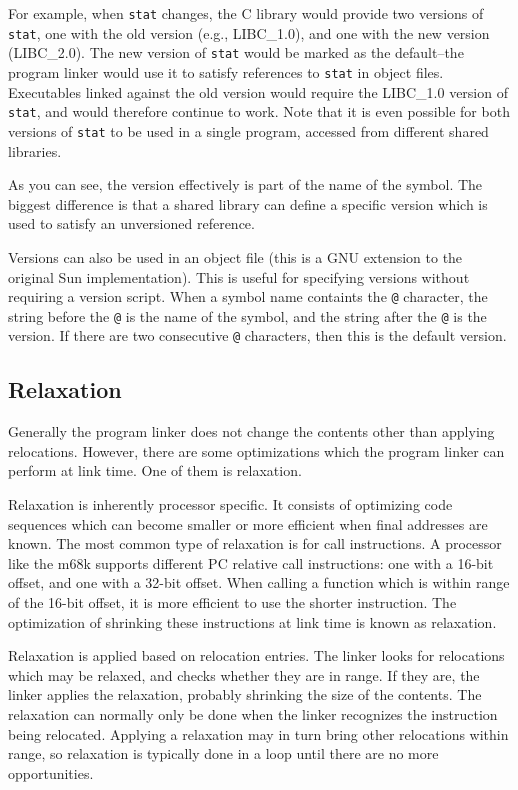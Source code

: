 For example, when \texttt{stat} changes, the C library would provide two
versions of \texttt{stat}, one with the old version (e.g., LIBC\_1.0), and
one with the new version (LIBC\_2.0). The new version of \texttt{stat}
would be marked as the default–the program linker would use it to satisfy
references to \texttt{stat} in object files. Executables linked against the
old version would require the LIBC\_1.0 version of \texttt{stat}, and would
therefore continue to work. Note that it is even possible for both versions of
\texttt{stat} to be used in a single program, accessed from different shared
libraries.

As you can see, the version effectively is part of the name of the symbol. The
biggest difference is that a shared library can define a specific version which
is used to satisfy an unversioned reference.

Versions can also be used in an object file (this is a GNU extension to the
original Sun implementation). This is useful for specifying versions without
requiring a version script. When a symbol name containts the \texttt{@}
character, the string before the \texttt{@} is the name of the symbol, and
the string after the \texttt{@} is the version. If there are two consecutive
\texttt{@} characters, then this is the default version.

\subsection{Relaxation}

Generally the program linker does not change the contents other than applying
relocations. However, there are some optimizations which the program linker can
perform at link time. One of them is relaxation.

Relaxation is inherently processor specific. It consists of optimizing code
sequences which can become smaller or more efficient when final addresses are
known. The most common type of relaxation is for call instructions. A processor
like the m68k supports different PC relative call instructions: one with a
16-bit offset, and one with a 32-bit offset. When calling a function which is
within range of the 16-bit offset, it is more efficient to use the shorter
instruction. The optimization of shrinking these instructions at link time is
known as relaxation.

Relaxation is applied based on relocation entries. The linker looks for
relocations which may be relaxed, and checks whether they are in range. If they
are, the linker applies the relaxation, probably shrinking the size of the
contents. The relaxation can normally only be done when the linker recognizes
the instruction being relocated. Applying a relaxation may in turn bring other
relocations within range, so relaxation is typically done in a loop until there
are no more opportunities.

